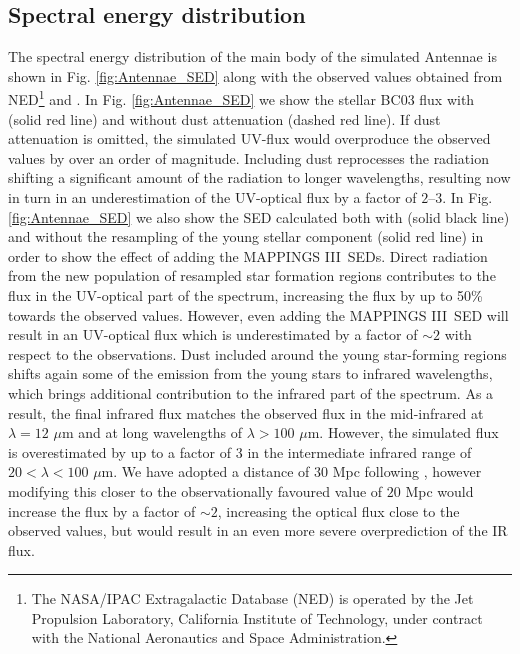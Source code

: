 \documentclass[a4paper,fleqn,usenatbib]{mnras}
\newcommand{\mappings}{\textsc{MAPPINGS III}}
\begin{document}
\subsection{Spectral energy distribution}


The spectral energy distribution of the main body of the simulated 
Antennae is shown in Fig. \ref{fig:Antennae_SED} along with the observed values obtained from 
NED\footnote{The NASA/IPAC Extragalactic
Database (NED) is operated by the Jet Propulsion Laboratory, California Institute of Technology,
under contract with the National Aeronautics and Space Administration.} and \citet{2010A&A...518L..44K}. In Fig. \ref{fig:Antennae_SED}
we show the stellar BC03 flux with (solid red line) and without dust attenuation (dashed red line). If dust attenuation is omitted, the simulated UV-flux 
would overproduce the observed values by over an order of magnitude. Including dust reprocesses the radiation shifting a significant amount of the radiation 
to longer wavelengths, resulting now in turn in an underestimation of the UV-optical flux by a factor of $2$--$3$.
In Fig. \ref{fig:Antennae_SED} we also show the SED calculated both with (solid black line) and without the resampling of the young
stellar component (solid red line) in order to show the effect of adding the \mappings\ SEDs.
Direct radiation from the new population of resampled star formation regions contributes to the flux in the UV-optical
part of the spectrum, increasing the flux by up to 50\% towards the observed values. 
However, even adding the \mappings\ SED will result in an UV-optical flux which is underestimated by a factor of $\sim 2$ with respect to the observations. 
Dust included around the young star-forming regions shifts again some of the emission from the young stars to infrared wavelengths, 
which brings additional contribution to the infrared part of the spectrum. As a result, the final infrared flux matches the 
observed flux in the mid-infrared at $\lambda=12$ $\mu$m and at long wavelengths of $\lambda>100$ $\mu$m. However, the simulated 
flux is overestimated by up to a factor of $3$ in the intermediate infrared range of $20 < \lambda < 100$ $\mu$m.
We have adopted a distance of $30$ Mpc following \citet{2010ApJ...715L..88K}, 
however modifying this closer to the observationally favoured value of $20$ Mpc would
increase the flux by a factor of $\sim 2$, increasing the optical flux close to the
observed values, but would result in an even more severe overprediction of the IR flux. 
\end{document}
